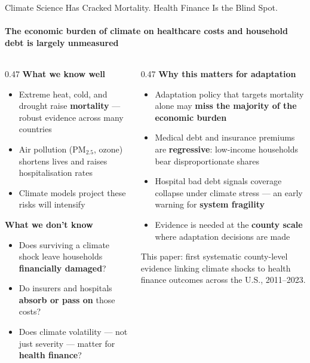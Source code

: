 \documentclass[aspectratio=169,11pt]{beamer}
\newcommand{\emphcolor}[1]{{\color{WarmOrange}\textbf{#1}}}
\newcommand{\tealtext}[1]{{\color{Teal}#1}}
\newcommand{\graytext}[1]{{\color{WarmGray}#1}}
\begin{document}
\begin{frame}[shrink=18]{Climate Science Has Cracked Mortality. Health Finance Is the Blind Spot.}
  \framesubtitle{The economic burden of climate on healthcare costs and household debt is largely unmeasured}
  \begin{columns}[T]
    \begin{column}{0.47\textwidth}
      \textbf{\tealtext{What we know well}}\\[0.2em]
      \footnotesize
      \begin{itemize}\itemsep0.18em
        \item Extreme heat, cold, and drought raise \emphcolor{mortality} — robust evidence across many countries
        \item Air pollution (PM$_{2.5}$, ozone) shortens lives and raises hospitalisation rates
        \item Climate models project these risks will intensify
      \end{itemize}
      \vspace{0.3em}
      \textbf{\tealtext{What we don't know}}\\[0.2em]
      \begin{itemize}\itemsep0.18em
        \item Does surviving a climate shock leave households \emphcolor{financially damaged}?
        \item Do insurers and hospitals \emphcolor{absorb or pass on} those costs?
        \item Does climate volatility — not just severity — matter for \emphcolor{health finance}?
      \end{itemize}
    \end{column}
    \begin{column}{0.47\textwidth}
      \textbf{\tealtext{Why this matters for adaptation}}\\[0.2em]
      \footnotesize
      \begin{itemize}\itemsep0.18em
        \item Adaptation policy that targets mortality alone may \emphcolor{miss the majority of the economic burden}
        \item Medical debt and insurance premiums are \emphcolor{regressive}: low-income households bear disproportionate shares
        \item Hospital bad debt signals coverage collapse under climate stress — an early warning for \emphcolor{system fragility}
        \item Evidence is needed at the \emphcolor{county scale} where adaptation decisions are made
      \end{itemize}
      \vspace{0.3em}
      \graytext{\scriptsize This paper: first systematic county-level evidence linking climate shocks to health finance outcomes across the U.S., 2011--2023.}
    \end{column}
  \end{columns}
\end{frame}
\end{document}
